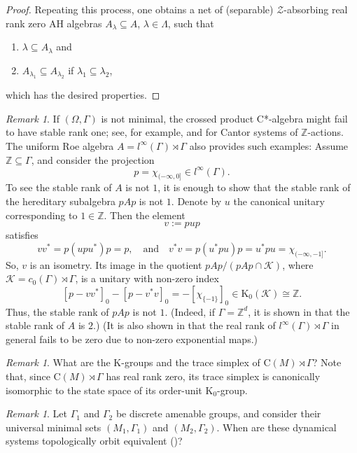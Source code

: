 \documentclass[12pt, oneside, psamsfonts]{amsart}
\theoremstyle{definition}
\theoremstyle{remark}
\newtheorem{rem}[thm]{Remark}
\numberwithin{equation}{section}
\newcommand{\Int}{\mathbb Z}
\newcommand{\Kzero}{\textrm{K}_0}
\begin{document}
\begin{proof}
Repeating this process, one obtains a net of (separable) $\mathcal Z$-absorbing real rank zero AH algebras $A_\lambda \subseteq A$, $\lambda \in \Lambda$, such that
\begin{enumerate}
\item[(1'')] $\lambda \subseteq A_\lambda$ and
\item[(2'')] $A_{\lambda_1} \subseteq A_{\lambda_2}$ if $\lambda_1 \subseteq \lambda_2$,
\end{enumerate}
which has the desired properties.
\end{proof}


\begin{rem}

If $(\Omega, \Gamma)$ is not minimal, the crossed product C*-algebra might fail to have stable rank one; see, for example, \cite{Poon-PAMS-89} and \cite{BNS-Cantor} for Cantor systems of $\Int$-actions. The uniform Roe algebra $A = l^\infty(\Gamma) \rtimes \Gamma$ also provides such examples: Assume $\Int \subseteq\Gamma$, and consider the projection $$p = \chi_{(-\infty, 0]} \in l^\infty(\Gamma). $$ To see the stable rank of $A$ is not $1$, it is enough to show that the stable rank of  the hereditary subalgebra $pAp$ is not $1$. Denote by $u$ the canonical unitary corresponding to $1 \in \Int$. Then the element 
$$ v := p u p$$
satisfies
$$vv^* = p(upu^*)p = p, \quad\mathrm{and} \quad v^*v = p(u^*pu)p =  u^*pu = \chi_{(-\infty, -1]}. $$ So, $v$ is an isometry. Its image in the quotient $pAp/(pAp\cap \mathcal K)$, where $\mathcal K = c_0(\Gamma) \rtimes \Gamma$,  is a unitary with non-zero index 
$$[p - vv^*]_0 - [ p - v^*v]_0 = -[\chi_{\{-1\}}]_0 \in \Kzero(\mathcal K) \cong \Int.$$
Thus, the stable rank of $pAp$ is not $1$. (Indeed, if $\Gamma  = \Int^d$, it is shown in \cite{LW-Roe} that the stable rank of $A$ is $2$.) (It is also shown in \cite{LW-Roe} that the real rank of $l^\infty(\Gamma) \rtimes \Gamma$ in general fails to be zero due to non-zero exponential maps.)
\end{rem}


\begin{rem}
What are the K-groups and the trace simplex of $\mathrm{C}(M) \rtimes \Gamma$? Note that, since $\mathrm{C}(M) \rtimes \Gamma$ has real rank zero, its trace simplex is canonically isomorphic to the state space of its order-unit $\Kzero$-group.
\end{rem}

\begin{rem}
Let $\Gamma_1$ and $\Gamma_2$ be discrete amenable groups, and consider their universal minimal sets $(M_1, \Gamma_1)$ and $(M_2, \Gamma_2)$. When are these dynamical systems topologically orbit equivalent (\cite{GPS-Cantor})? 
\end{rem}
\end{document}

